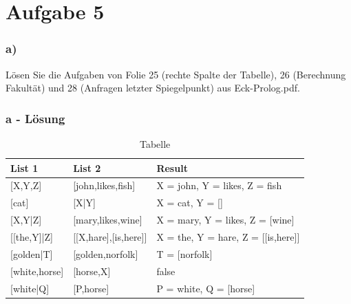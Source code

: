 \chapter{Aufgabe 5}
\label{sec:aufgabe5}

\subsection*{a)}
Lösen Sie die Aufgaben von Folie 25 (rechte Spalte der Tabelle), 26 (Berechnung Fakultät) und 28 (Anfragen letzter Spiegelpunkt) aus Eck-Prolog.pdf.
\newline

\subsection*{a - Lösung}
\newline

\begin{table}[h]
\centering
\begin{tabular}{@{}lll@{}}
\toprule
List 1              & List 2                                                & Result                                     \\ \midrule
{[}X,Y,Z{]}         & \multicolumn{1}{l|}{{[}john,likes,fish{]}}            & X = john, Y = likes, Z = fish              \\
{[}cat{]}           & \multicolumn{1}{l|}{{[}X|Y{]}}                        & X = cat, Y = {[}{]}                        \\
{[}X,Y|Z{]}         & \multicolumn{1}{l|}{{[}mary,likes,wine{]}}            & X = mary, Y = likes, Z = {[}wine{]}        \\
{[}{[}the,Y{]}|Z{]} & \multicolumn{1}{l|}{{[}{[}X,hare{]},{[}is,here{]}{]}} & X = the, Y = hare, Z = {[}{[}is,here{]}{]} \\
{[}golden|T{]}      & \multicolumn{1}{l|}{{[}golden,norfolk{]}}             & T = {[}norfolk{]}                          \\
{[}white,horse{]}   & \multicolumn{1}{l|}{{[}horse,X{]}}                    & false                                      \\
{[}white|Q{]}       & \multicolumn{1}{l|}{{[}P,horse{]}}                    & P = white, Q = {[}horse{]}                 \\ \bottomrule
\end{tabular}\label{tab:folie25}
\caption{Tabelle}
\vspace{2mm}
\end{table}

